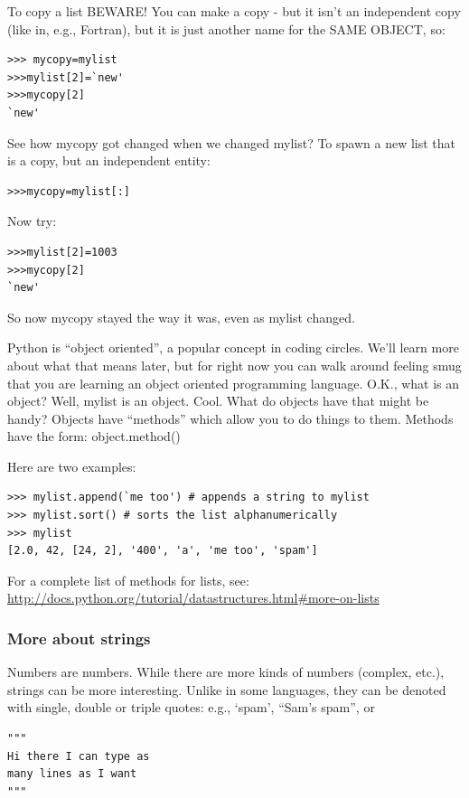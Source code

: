 \documentclass[11pt]{book}
\begin{document}
{{To copy a list BEWARE! You can make  a copy - but it isn't an independent copy (like in, e.g.,  Fortran), but it is just another name for the SAME OBJECT, so:
{ \color{blue} \begin{verbatim}
>>> mycopy=mylist
>>>mylist[2]=`new'
>>>mycopy[2]
`new'
\end{verbatim}}
\noindent
See how mycopy got changed when we changed mylist?
\noindent
To spawn a new list that is a copy, but an independent entity:
{ \color{blue} \begin{verbatim}
>>>mycopy=mylist[:]
\end{verbatim}}
\noindent
Now try:
{ \color{blue} \begin{verbatim}
>>>mylist[2]=1003
>>>mycopy[2]
`new'
\end{verbatim}}
\noindent
So now {\color{blue}mycopy}  stayed the way it was, even as {\color{blue}mylist } changed.  


Python is ``object oriented'', a popular concept in coding circles.  We'll learn more about what that means later, but for right now you can walk around feeling smug that you are learning an object oriented programming language.   O.K., what is an object?  Well, 
{\color{blue}mylist} is an object.   Cool.  What do objects have that might be handy?  
Objects have ``methods'' which allow you to do things to them.  Methods have the form:
{\color{blue}object.method()}

\noindent
Here are two examples:

{ \color{blue} \begin{verbatim}
>>> mylist.append(`me too') # appends a string to mylist
>>> mylist.sort() # sorts the list alphanumerically
>>> mylist
[2.0, 42, [24, 2], '400', 'a', 'me too', 'spam']
\end{verbatim}}


\noindent

 For a complete list of methods for lists, see:
\url{http://docs.python.org/tutorial/datastructures.html#more-on-lists}

\subsubsection{More about strings}
Numbers are numbers. While there are more kinds of numbers (complex, etc.),
strings can be  more interesting. Unlike in some languages, they can be denoted with single, double or triple quotes:  e.g.,
`spam',  ``Sam's spam'', or
{ \color{blue} \begin{verbatim}
"""  
Hi there I can type as
many lines as I want
"""
\end{verbatim}}

}}
\end{document}
